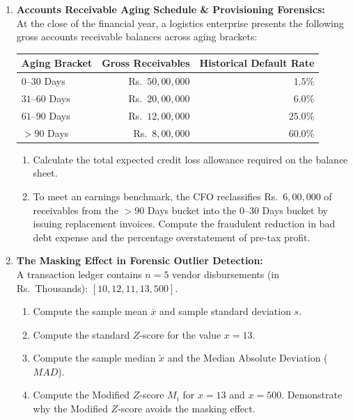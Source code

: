 \begin{enumerate}[label=\textbf{P6.\arabic*}]
    \item \textbf{Accounts Receivable Aging Schedule \& Provisioning Forensics:}\\
    At the close of the financial year, a logistics enterprise presents the following gross accounts receivable balances across aging brackets:
    \begin{center}
    \begin{tabular}{lrr}
    \toprule
    \textbf{Aging Bracket} & \textbf{Gross Receivables} & \textbf{Historical Default Rate} \\
    \midrule
    $0$--$30$ Days & Rs.~$50{,}00{,}000$ & $1.5\%$ \\
    $31$--$60$ Days & Rs.~$20{,}00{,}000$ & $6.0\%$ \\
    $61$--$90$ Days & Rs.~$12{,}00{,}000$ & $25.0\%$ \\
    $>90$ Days & Rs.~$8{,}00{,}000$ & $60.0\%$ \\
    \bottomrule
    \end{tabular}
    \end{center}
    \begin{enumerate}[label=(\alph*)]
        \item Calculate the total expected credit loss allowance required on the balance sheet.
        \item To meet an earnings benchmark, the CFO reclassifies Rs.~$6{,}00{,}000$ of receivables from the $>90$ Days bucket into the $0$--$30$ Days bucket by issuing replacement invoices. Compute the fraudulent reduction in bad debt expense and the percentage overstatement of pre-tax profit.
    \end{enumerate}

    \item \textbf{The Masking Effect in Forensic Outlier Detection:}\\
    A transaction ledger contains $n = 5$ vendor disbursements (in Rs.~Thousands): $[10, 12, 11, 13, 500]$.
    \begin{enumerate}[label=(\alph*)]
        \item Compute the sample mean $\bar{x}$ and sample standard deviation $s$.
        \item Compute the standard $Z$-score for the value $x = 13$.
        \item Compute the sample median $\tilde{x}$ and the Median Absolute Deviation ($MAD$).
        \item Compute the Modified $Z$-score $M_i$ for $x = 13$ and $x = 500$. Demonstrate why the Modified $Z$-score avoids the masking effect.
    \end{enumerate}


\end{enumerate}
